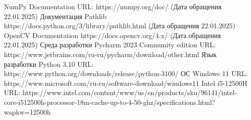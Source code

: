 \begin{thebibliography}{}
	NumPy Documentation
    URL: https://numpy.org/doc/ (Дата обращения 22.01.2025)
	Документация Pathlib
	https://docs.python.org/3/library/pathlib.html (Дата обращения 22.01.2025)
	OpenCV Documentation
	https://docs.opencv.org/4.x/ (Дата обращения 22.01.2025)
	Среда разработки Pycharm 2023 Community edition
	URL: https://www.jetbrains.com/ru-ru/pycharm/download/other.html
	Язык разработки Python 3.10
	URL: https://www.python.org/downloads/release/python-3100/
	ОС Windows 11
	URL: https://www.microsoft.com/ru-ru/software-download/windows11
	Intel i5-12500H
	URL: https://www.intel.com/content/www/us/en/products/sku/96141/intel-core-i512500h-processor-18m-cache-up-to-4-50-ghz/specifications.html?wapkw=12500h
\end{thebibliography}